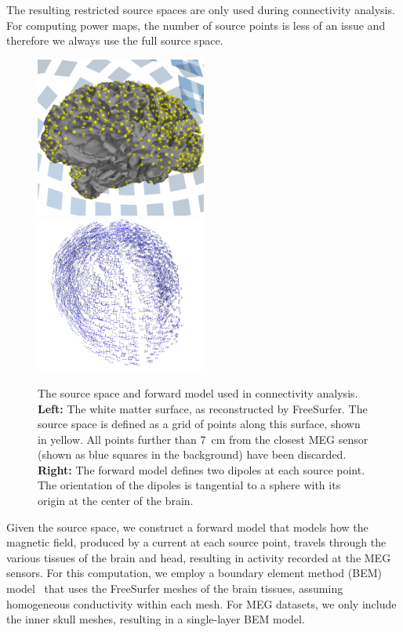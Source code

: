 \documentclass[utf8]{frontiersSCNS}
\renewcommand{\cite}[1]{~\citep{#1}}
\begin{document}
The resulting restricted source spaces are only used during connectivity analysis.
For computing power maps, the number of source points is less of an issue and therefore we always use the full source space.

\begin{figure}
    \centering
    \includegraphics[width=0.5\textwidth]{figures/forward1.png}%
    \includegraphics[width=0.5\textwidth]{figures/forward2.png}%
    \caption{The source space and forward model used in connectivity analysis.
    \textbf{Left:} The white matter surface, as reconstructed by FreeSurfer.
    The source space is defined as a grid of points along this surface, shown in yellow.
    All points further than \SI{7}{\centi\meter} from the closest MEG sensor (shown as blue squares in the background) have been discarded.
    \textbf{Right:} The forward model defines two dipoles at each source point.
    The orientation of the dipoles is tangential to a sphere with its origin at the center of the brain.}\label{fig:forward}
\end{figure}

Given the source space, we construct a forward model that models how the magnetic field, produced by a current at each source point, travels through the various tissues of the brain and head, resulting in activity recorded at the MEG sensors.
For this computation, we employ a boundary element method (BEM) model\cite{Hamalainen1993} that uses the FreeSurfer meshes of the brain tissues, assuming homogeneous conductivity within each mesh.
For MEG datasets, we only include the inner skull meshes, resulting in a single-layer BEM model.
\end{document}
